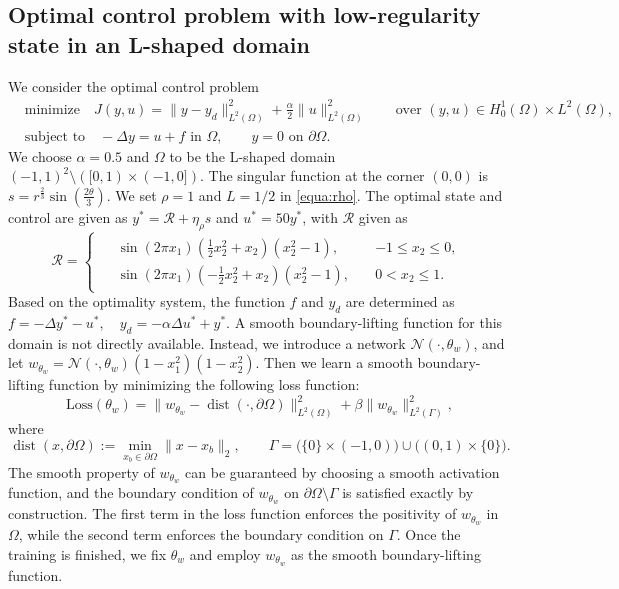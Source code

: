 \documentclass{article}
\numberwithin{equation}{section}
\begin{document}
\subsection{Optimal control problem with low-regularity state in an L-shaped domain}
We consider the optimal control problem
\begin{align*}
    &\text{minimize}\quad J(y,u)=\|y-y_d\|_{L^2(\Omega)}^2 + \frac{\alpha}{2}\|u\| _{L^2(\Omega)}^2\qquad \text{over }(y,u)\in H^1_0(\Omega)\times L^2(\Omega),\\
&\text{subject to}\quad
-\Delta y = u+f  \text{ in } \Omega, 
\qquad y = 0  \text{ on } \partial \Omega.
\end{align*}
We choose $\alpha=0.5$ and $\Omega$ to be the L-shaped domain $(-1,1)^2\setminus ([0,1)\times(-1,0])$. The singular function at the corner $(0,0)$ is $s=r^{\frac{2}{3}}\sin(\frac{2\theta}{3})$. We set $\rho=1$ and $L=1/2$ in \eqref{equa:rho}. The optimal state and control are given as $y^* = \mathcal{R}+\eta_\rho s$ and $u^*=50y^*$, with $\mathcal{R}$ given as
\begin{equation}
    \mathcal{R} = \begin{cases}
    \begin{aligned}
         &\sin(2\pi x_1)(\frac{1}{2}x_2^2+x_2)(x_2^2-1),\quad &-1\le x_2\le 0,\\
        &\sin(2\pi x_1)(-\frac{1}{2}x_2^2+x_2)(x_2^2-1),\quad &0< x_2\le 1.
    \end{aligned}
    \end{cases}
\end{equation}
Based on the optimality system, the function $f$ and $y_d$ are determined as
 $f=-\Delta y ^*-u^*,\quad y_d = -\alpha \Delta u ^* + y^*$.
A smooth boundary-lifting function for this domain is not directly available. Instead, we introduce a network $\mathcal{N}(\cdot,\theta_w)$, and let $w_{\theta_w}=\mathcal{N}(\cdot,\theta_w)(1-x_1^2)(1-x_2^2)$. Then we learn a smooth boundary-lifting function by minimizing the following loss function:
\begin{equation}
    \text{Loss}(\theta_w)=\|w_{\theta_w}-\operatorname{dist}(\cdot,\partial\Omega)\|_{L^2(\Omega)}^2 + \beta\|w_{\theta_w}\|_{L^2(\Gamma)}^2,
\end{equation}
where 
\begin{equation}
   \operatorname{dist}(x,\partial\Omega):=\min_{x_b\in \partial\Omega}\|x-x_b\|_2 ,\qquad \Gamma = \big(\{0\}\times (-1,0)\big) \cup \big((0,1)\times \{0\}\big).
\end{equation}
The smooth property of $w_{\theta_w}$ can be guaranteed by choosing a smooth activation function, and the boundary condition of $w_{\theta_w}$ on $\partial\Omega\setminus\Gamma$ is satisfied exactly by construction. The first term in the loss function enforces the positivity of $w_{\theta_w}$ in $\Omega$, while the second term enforces the boundary condition on $\Gamma$. Once the training is finished, we fix $\theta_w$ and employ $w_{\theta_w}$ as the smooth boundary-lifting
function.
\end{document}
